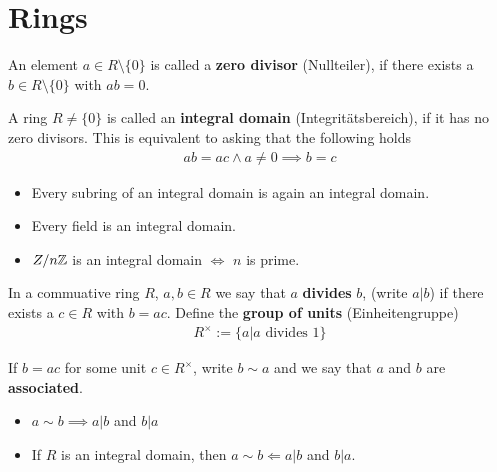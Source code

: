 \section{Rings}





\begin{dfn}
  An element $a \in R \setminus \{0\}$ is called a \textbf{zero divisor} (Nullteiler), if there exists a $b \in R \setminus \{0\}$ with $a b = 0$.

  A ring $R \neq \{0\}$ is called an \textbf{integral domain} (Integritätsbereich), if it has no zero divisors.
  This is equivalent to asking that the following holds
  \begin{align*}
    ab = ac \land a \neq 0 \implies b = c
  \end{align*}
\end{dfn}

\begin{prop}[]
  \phantom{a}
  \begin{itemize}
    \item Every subring of an integral domain is again an integral domain.
    \item Every field is an integral domain.
    \item $Z/n\mathbb{Z}$ is an integral domain $\iff$ $n$ is prime.
  \end{itemize}
\end{prop}

\begin{dfn}
  In a commuative ring $R$, $a,b \in R$ we say that $a$ \textbf{divides} $b$, (write $a | b$) if there exists a $c \in R$ with $b = ac$.
  Define the \textbf{group of units} (Einheitengruppe)
  \begin{align*}
    R^{\times} := \{a \big\vert a \text{ divides } 1\}
  \end{align*}

  If $b = ac$ for some unit $c \in R^{\times}$, write $b \sim a$ and we say that $a$ and $b$ are \textbf{associated}.
\end{dfn}

\begin{prop}[]
  \phantom{a}
\begin{itemize}
  \item $a \sim b \implies a|b$ and $b|a$
  \item If $R$ is an integral domain, then $a \sim b \Leftarrow a | b$ and $b | a$.
\end{itemize}
\end{prop}

